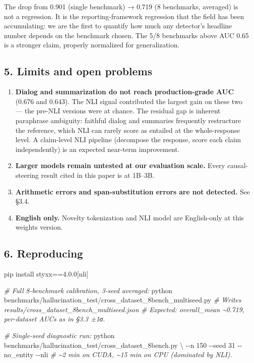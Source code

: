 \documentclass[
  11pt]{article}
\newenvironment{Shaded}{}{}
\newcommand{\AttributeTok}[1]{\textcolor[rgb]{0.49,0.56,0.16}{#1}}
\newcommand{\CommentTok}[1]{\textcolor[rgb]{0.38,0.63,0.69}{\textit{#1}}}
\newcommand{\DataTypeTok}[1]{\textcolor[rgb]{0.56,0.13,0.00}{#1}}
\newcommand{\ExtensionTok}[1]{#1}
\newcommand{\NormalTok}[1]{#1}
\newcommand{\PreprocessorTok}[1]{\textcolor[rgb]{0.74,0.48,0.00}{#1}}
\newcommand{\SpecialStringTok}[1]{\textcolor[rgb]{0.73,0.40,0.53}{#1}}
\providecommand{\tightlist}{%
  \setlength{\itemsep}{0pt}\setlength{\parskip}{0pt}}
\begin{document}
The drop from 0.901 (single benchmark) → 0.719 (8 benchmarks, averaged)
is not a regression. It is the reporting-framework regression that the
field has been accumulating: we are the first to quantify how much any
detector's headline number depends on the benchmark chosen. The 5/8
benchmarks above AUC 0.65 is a stronger claim, properly normalized for
generalization.

\subsection{5. Limits and open problems}\label{limits-and-open-problems}

\begin{enumerate}
\def\labelenumi{\arabic{enumi}.}
\tightlist
\item
  \textbf{Dialog and summarization do not reach production-grade AUC}
  (0.676 and 0.643). The NLI signal contributed the largest gain on
  these two --- the pre-NLI versions were at chance. The residual gap is
  inherent paraphrase ambiguity: faithful dialog and summaries
  frequently restructure the reference, which NLI can rarely score as
  entailed at the whole-response level. A claim-level NLI pipeline
  (decompose the response, score each claim independently) is an
  expected near-term improvement.
\item
  \textbf{Larger models remain untested at our evaluation scale.} Every
  causal-steering result cited in this paper is at 1B--3B.
\item
  \textbf{Arithmetic errors and span-substitution errors are not
  detected.} See §3.4.
\item
  \textbf{English only.} Novelty tokenization and NLI model are
  English-only at this weights version.
\end{enumerate}

\subsection{6. Reproducing}\label{reproducing}

\begin{Shaded}
\begin{Highlighting}[]
\ExtensionTok{pip}\NormalTok{ install styxx==4.0.0}\PreprocessorTok{[}\SpecialStringTok{nli}\PreprocessorTok{]}

\CommentTok{\# Full 8{-}benchmark calibration, 3{-}seed averaged:}
\ExtensionTok{python}\NormalTok{ benchmarks/hallucination\_test/cross\_dataset\_8bench\_multiseed.py}
\CommentTok{\# Writes results/cross\_dataset\_8bench\_multiseed.json}
\CommentTok{\# Expected: overall\_mean \textasciitilde{}0.719, per{-}dataset AUCs as in §3.3 ±1σ.}

\CommentTok{\# Single{-}seed diagnostic run:}
\ExtensionTok{python}\NormalTok{ benchmarks/hallucination\_test/cross\_dataset\_8bench.py }\DataTypeTok{\textbackslash{}}
    \AttributeTok{{-}{-}n}\NormalTok{ 150 }\AttributeTok{{-}{-}seed}\NormalTok{ 31 }\AttributeTok{{-}{-}no\_entity} \AttributeTok{{-}{-}nli}
\CommentTok{\# \textasciitilde{}2 min on CUDA, \textasciitilde{}15 min on CPU (dominated by NLI).}
\end{Highlighting}
\end{Shaded}
\end{document}
